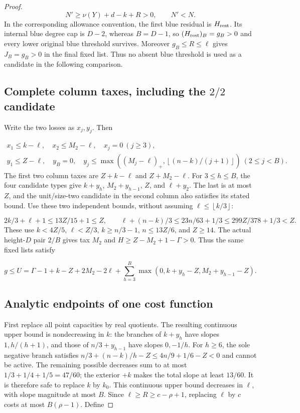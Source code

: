 \documentclass[11pt,a4paper]{article}
\newcommand{\floor}[1]{\left\lfloor#1\right\rfloor}
\theoremstyle{definition}
\begin{document}
\begin{proof}
\[
N'\ge\nu(Y)+d-k+R>0,\qquad N'<N.
\]
In the corresponding allowance convention, the first blue residual is
$H_{\rm rest}$. Its internal blue degree cap is $D-2$, whereas
$B=D-1$, so $(H_{\rm rest})_B=g_B>0$ and every lower original blue
threshold survives. Moreover $g_B\le R\le\ell$ gives $J_B=g_B>0$
in the final fixed list. Thus no absent blue threshold is used as a
candidate in the following comparison.

\subsection*{Complete column taxes, including the $2/2$ candidate}
Write the two losses as $x_j,y_j$. Then

\[
\begin{gathered}
x_1\le k-\ell,\quad x_2\le M_2-\ell,\quad x_j=0\ (j\ge3),\\
y_1\le Z-\ell,\quad y_B=0,\quad
y_j\le\max((M_j-\ell)_+,\floor{(n-k)/(j+1)})\ (2\le j<B).
\end{gathered}
\]
The first two column taxes are $Z+k-\ell$ and $Z+M_2-\ell$.
For $3\le h\le B$, the four candidate types give
$k+y_h$, $M_2+y_{h-1}$, $Z$, and $\ell+y_2$.
The last is at most $Z$, and the unit/size-two candidate in the second column
also satisfies its stated bound.
Use these two independent bounds, without assuming $\ell\le\floor{k/3}$:

\[
2k/3+\ell+1\le13Z/15+1\le Z,\qquad
\ell+(n-k)/3\le23n/63+1/3\le299Z/378+1/3<Z.
\]
These use $k<4Z/5$, $\ell<Z/3$, $k\ge n/3-1$,
$n\le13Z/6$, and $Z\ge14$.
The actual height-$D$ pair $2/B$ gives tax $M_2$ and
$H\ge Z-M_2+1-\Gamma>0$.
Thus the same fixed lists satisfy

\[
g\le U=\Gamma-1+k-Z+2M_2-2\ell+
\sum_{h=3}^{B}\max(0,k+y_h-Z,M_2+y_{h-1}-Z).
\]
\subsection*{Analytic endpoints of one cost function}
First replace all point capacities by real quotients.
The resulting continuous upper bound is nondecreasing in $k$:
the branches of $k+y_h$ have slopes $1,h/(h+1)$,
and those of $n/3+y_{h-1}$ have slopes $0,-1/h$.
For $h\ge6$, the sole negative branch satisfies
$n/3+(n-k)/h-Z\le4n/9+1/6-Z<0$ and cannot be active.
The remaining possible decreases sum to at most
$1/3+1/4+1/5=47/60$; the exterior $+k$ makes the total slope at least $13/60$.
It is therefore safe to replace $k$ by $k_0$.
This continuous upper bound decreases in $\ell$, with slope magnitude at most $B$.
Since $\ell\ge R\ge c-\rho+1$, replacing $\ell$ by $c$ costs at most $B(\rho-1)$.
Define


\end{proof}
\end{document}
